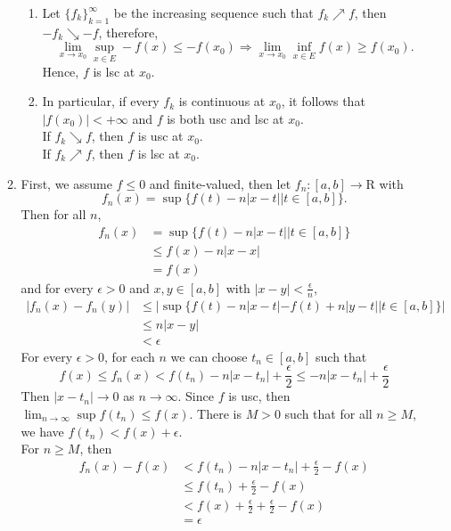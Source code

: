 \documentclass[a4paper,11pt]{article}
\begin{document}
\begin{enumerate}
\begin{enumerate}
\begin{enumerate}
\item
Let $\{ f_k \}_{k=1}^{\infty}$ be the increasing sequence such that $f_k \nearrow f$, then $-f_k \searrow -f$, therefore,
$$\lim_{x \to x_0} \sup_{ x \in E} -f(x) \leq -f(x_0)
\Rightarrow
\lim_{x \to x_0} \inf_{ x \in E} f(x) \geq f(x_0).$$
Hence, $f$ is lsc at $x_0$.\\

\item
In particular, if every $f_k$ is continuous at $x_0$, it follows that $|f(x_0)| < +\infty$ and $f$ is both usc and lsc at $x_0$.\\
If $f_k \searrow f$, then $f$ is usc at $x_0$.\\
If $f_k \nearrow f$, then $f$ is lsc at $x_0$.\\

\end{enumerate}

\newpage

\item
First, we assume $f \leq 0$ and finite-valued, then let $f_n:[a,b] \to \mathrm{R}$ with
$$f_n(x) = \sup\{ f(t) - n|x - t| | t \in[a,b] \}.$$
Then for all $n$,
$$\begin{aligned}
f_n(x) 
& = \sup \{ f(t) - n |x - t| | t \in [a,b] \}\\
& \leq f(x) - n|x-x|\\
& = f(x)
\end{aligned}$$
and for every $\epsilon > 0$ and $x, y \in [a,b]$ with $|x - y| < \frac{\epsilon}{n}$,
$$\begin{aligned}
|f_n(x) - f_n(y)|
& \leq |\sup\{ f(t) - n|x - t| - f(t) + n|y-t| | t \in [a,b] \}|\\
& \leq n |x - y|\\
& < \epsilon
\end{aligned}$$
For every $\epsilon > 0$, for each $n$ we can choose $t_n \in [a,b]$ such that
$$f(x)
\leq f_n(x)
< f(t_n) - n|x - t_n| + \frac{\epsilon}{2} \leq -n|x-t_n| + \frac{\epsilon}{2}$$
Then $|x - t_n| \to 0$ as $n \to \infty$. Since $f$ is usc, then $\lim_{n \to \infty} \sup f(t_n) \leq f(x)$. There is $M > 0$ such that for all $n \geq M$, we have $f(t_n) < f(x) + \epsilon$.\\
For $n \geq M$, then
$$\begin{aligned}
f_n(x) - f(x)
& < f(t_n) - n|x - t_n| + \frac{\epsilon}{2} - f(x)\\
& \leq f(t_n) + \frac{\epsilon}{2} - f(x)\\
&< f(x) + \frac{\epsilon}{2} + \frac{\epsilon}{2} - f(x)\\
&= \epsilon
\end{aligned}$$


\end{enumerate}
\end{enumerate}
\end{document}
